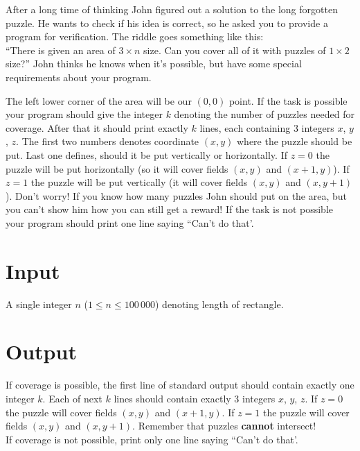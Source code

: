 \documentclass{spiral}
\begin{document}
  \makeheader

  After a long time of thinking John figured out a solution to the long forgotten puzzle.
  He wants to check if his idea is correct, so he asked you to provide a program for verification.
  The riddle goes something like this:\\
  ``There is given an area of $3 \times n$ size. Can you cover all of it with puzzles of $1 \times 2$ size?''
  John thinks he knows when it's possible, but have some special requirements about your program.

  The left lower corner of the area will be our $(0, 0)$ point.
  If the task is possible your program should give the integer $k$
  denoting the number of puzzles needed for coverage.
  After that it should print exactly $k$ lines, each containing 3 integers $x$, $y$, $z$.
  The first two numbers denotes coordinate $(x, y)$ where the puzzle should be put.
  Last one defines, should it be put vertically or horizontally.
  If $z = 0$ the puzzle will be put horizontally (so it will cover fields $(x, y)$ and $(x + 1, y)$).
  If $z = 1$ the puzzle will be put vertically (it will cover fields $(x, y)$ and $(x, y + 1)$).
  Don't worry! If you know how many puzzles John should put on the area, but you can't show him how
  you can still get a reward!
  If the task is not possible your program should print one line saying ``Can't do that'.


  \section{Input}

    A single integer $n$ ($1 \leq n \leq 100\,000$) denoting length of rectangle.

  \section{Output}

    If coverage is possible, the first line of standard output should contain exactly one integer $k$.
    Each of next $k$ lines should contain exactly 3 integers $x$, $y$, $z$.
    If $z = 0$ the puzzle will cover fields $(x, y)$ and $(x + 1, y)$.
    If $z = 1$ the puzzle will cover fields $(x, y)$ and $(x, y + 1)$.
    Remember that puzzles \textbf{cannot} intersect!\\
    If coverage is not possible, print only one line saying ``Can't do that'.
    

\end{document}
